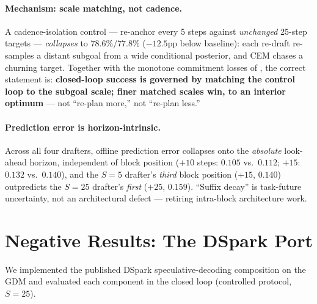 \documentclass{article}
\begin{document}
\paragraph{Mechanism: scale matching, not cadence.} A cadence-isolation control ---
re-anchor every 5 steps against \emph{unchanged} 25-step targets --- \emph{collapses} to
$78.6\%/77.8\%$ ($-12.5$pp below baseline): each re-draft re-samples a distant subgoal
from a wide conditional posterior, and CEM chases a churning target. Together with the
monotone commitment losses of , the correct statement is: \textbf{closed-loop
success is governed by matching the control loop to the subgoal scale; finer matched
scales win, to an interior optimum} --- not ``re-plan more,'' not ``re-plan less.''

\paragraph{Prediction error is horizon-intrinsic.} Across all four drafters, offline
prediction error collapses onto the \emph{absolute} look-ahead horizon, independent of
block position ($+10$ steps: $0.105$ vs.\ $0.112$; $+15$: $0.132$ vs.\ $0.140$), and the
$S{=}5$ drafter's \emph{third} block position ($+15$, $0.140$) outpredicts the $S{=}25$
drafter's \emph{first} ($+25$, $0.159$). ``Suffix decay'' is task-future uncertainty, not
an architectural defect --- retiring intra-block architecture work.

\section{Negative Results: The DSpark Port}
\label{sec:neg}

We implemented the published DSpark speculative-decoding composition on the GDM and
evaluated each component in the closed loop (controlled protocol, $S{=}25$).
\end{document}
